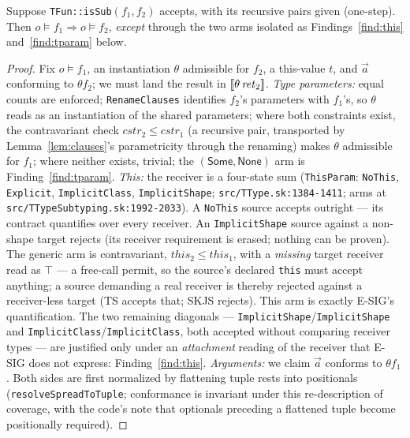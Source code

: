 \documentclass[11pt]{article}
\begin{document}
\begin{theorem}
\label{thm:tfun}
Suppose \texttt{TFun::isSub}$(f_1, f_2)$ accepts, with its recursive
pairs given (one-step). Then $o \vDash f_1 \Rightarrow o \vDash f_2$,
\emph{except} through the two arms isolated as
Findings~\ref{find:this} and~\ref{find:tparam} below.
\end{theorem}
\begin{proof}
Fix $o \vDash f_1$, an instantiation $\theta$ admissible for $f_2$, a
this-value $t$, and $\vec{a}$ conforming to $\theta f_2$; we must land
the result in $\llbracket \theta\,\mathit{ret}_2 \rrbracket$.
\emph{Type parameters:} equal counts are enforced;
\texttt{RenameClauses} identifies $f_2$'s parameters with $f_1$'s, so
$\theta$ reads as an instantiation of the shared parameters; where both
constraints exist, the contravariant check
$\mathit{cstr}_2 \leq \mathit{cstr}_1$ (a recursive pair, transported by
Lemma~\ref{lem:clauses}'s parametricity through the renaming) makes
$\theta$ admissible for $f_1$; where neither exists, trivial; the
$(\mathsf{Some},\mathsf{None})$ arm is Finding~\ref{find:tparam}.
\emph{This:} the receiver is a four-state sum
(\texttt{ThisParam}: \texttt{NoThis}, \texttt{Explicit},
\texttt{ImplicitClass}, \texttt{ImplicitShape};
\texttt{src/TType.sk:1384-1411}; arms at
\texttt{src/TTypeSubtyping.sk:1992-2033}). A \texttt{NoThis} source
accepts outright --- its contract quantifies over every receiver. An
\texttt{ImplicitShape} source against a non-shape target rejects
(its receiver requirement is erased; nothing can be proven). The
generic arm is contravariant, $\mathit{this}_2 \leq \mathit{this}_1$,
with a \emph{missing} target receiver read as $\top$ --- a free-call
permit, so the source's declared \texttt{this} must accept anything;
a source demanding a real receiver is thereby rejected against a
receiver-less target (TS accepts that; SKJS rejects). This arm is
exactly E-SIG's quantification. The two remaining diagonals ---
\texttt{ImplicitShape}/\texttt{ImplicitShape} and
\texttt{ImplicitClass}/\texttt{ImplicitClass}, both accepted without
comparing receiver types --- are justified only under an
\emph{attachment} reading of the receiver that E-SIG does not express:
Finding~\ref{find:this}.
\emph{Arguments:} we claim $\vec{a}$ conforms to $\theta f_1$. Both
sides are first normalized by flattening tuple rests into positionals
(\texttt{resolveSpreadToTuple}; conformance is invariant under this
re-description of coverage, with the code's note that optionals
preceding a flattened tuple become positionally required).

\end{proof}
\end{document}
